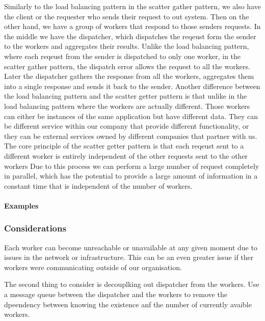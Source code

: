 \documentclass[a4paper, 11pt]{book}
\begin{document}
    Similarly to the load balancing pattern in the scatter gather pattern, we also have the client or the requester who sends their request to out system.
    Then on the other hand, we have a group of workers that respond to those senders requests.
    In the middle we have the dispatcher, which dispatches the reqeust form the sender to the workers and aggregates their results.
    Unlike the load balancing pattern, where each reqeust from the sender is dispatched to only one worker, in the scatter gather pattern, the dispatch error allows the request to all the workers.
    Later the dispatcher gathers the response from all the workers, aggregates them into a single response and sends it back to the sender.
    Another difference between the load balancing pattern and the scatter getter pattern is that unlike in the load balancing pattern where the workers are actually different.
    Those workers can either be instances of the same application but have different data.
    They can be different service within our company that provide different functionality, or they can be external services owned by different companies that partner with us.
    The core principle of the scatter getter pattern is that each reqeust sent to a different worker is entirely independent of the other requests sent to the other workers
    Due to this process we can perform a large number of request completely in parallel, which has the potential to provide a large amount of information in a constant time that is independent of the number of workers.

    \paragraph{Examples}

    \subsubsection{Considerations}

    Each worker can become unreachable or unavailable at any given moment due to issues in the network or infrastructure.
    This can be an even greater issue if ther workers were communicating outside of our organisation.

    The second thing to consider is decouplking out dispatcher from the workers.
    Use a message queue between the dispatcher and the workers to remove the dpeendency between knowing the existence anf the number of currently avaible workers.
\end{document}
